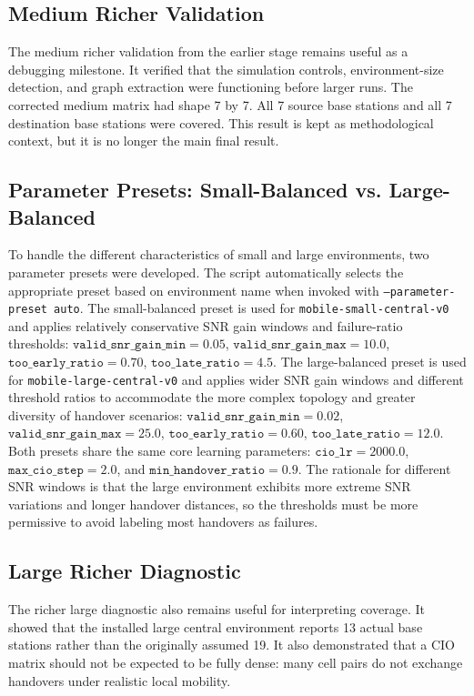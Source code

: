 \documentclass[11pt,a4paper]{article}
\begin{document}
\subsection{Medium Richer Validation}
The medium richer validation from the earlier stage remains useful as a debugging milestone. It verified that the simulation controls, environment-size detection, and graph extraction were functioning before larger runs. The corrected medium matrix had shape 7 by 7. All 7 source base stations and all 7 destination base stations were covered. This result is kept as methodological context, but it is no longer the main final result.

\subsection{Parameter Presets: Small-Balanced vs. Large-Balanced}
To handle the different characteristics of small and large environments, two parameter presets were developed. The script automatically selects the appropriate preset based on environment name when invoked with \texttt{--parameter-preset auto}. The small-balanced preset is used for \texttt{mobile-small-central-v0} and applies relatively conservative SNR gain windows and failure-ratio thresholds: $\texttt{valid\_snr\_gain\_min} = 0.05$, $\texttt{valid\_snr\_gain\_max} = 10.0$, $\texttt{too\_early\_ratio} = 0.70$, $\texttt{too\_late\_ratio} = 4.5$. The large-balanced preset is used for \texttt{mobile-large-central-v0} and applies wider SNR gain windows and different threshold ratios to accommodate the more complex topology and greater diversity of handover scenarios: $\texttt{valid\_snr\_gain\_min} = 0.02$, $\texttt{valid\_snr\_gain\_max} = 25.0$, $\texttt{too\_early\_ratio} = 0.60$, $\texttt{too\_late\_ratio} = 12.0$. Both presets share the same core learning parameters: $\texttt{cio\_lr} = 2000.0$, $\texttt{max\_cio\_step} = 2.0$, and $\texttt{min\_handover\_ratio} = 0.9$. The rationale for different SNR windows is that the large environment exhibits more extreme SNR variations and longer handover distances, so the thresholds must be more permissive to avoid labeling most handovers as failures.

\subsection{Large Richer Diagnostic}
The richer large diagnostic also remains useful for interpreting coverage. It showed that the installed large central environment reports 13 actual base stations rather than the originally assumed 19. It also demonstrated that a CIO matrix should not be expected to be fully dense: many cell pairs do not exchange handovers under realistic local mobility.
\end{document}
